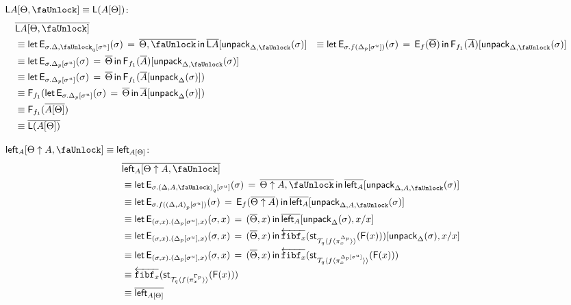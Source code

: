 \documentclass[10pt]{article}
\theoremstyle{definition}
\newcommand{\rewrite}[2]{\overleftarrow{#1}(#2)}
\newcommand\F[2]{\ensuremath{\mathsf{F}_{#1}(#2)}}
\newcommand\StI[2]{\ensuremath{\mathsf{st}_{#1}(#2)}}
\newcommand\FI[1]{\ensuremath{\mathsf{F}{(#1)}}}
\newcommand\EEs[4]{\ensuremath{\mathsf{let} \, \mathsf{E}_{#1}(#3) \, = \, {#2} \, \mathsf{in} \, #4}}
\newcommand\EIs[2]{\ensuremath{\mathsf{E}_{#1}{(#2)}}}
\newcommand\ApEl[2]{\mathcal{T}_{#1}\langle#2\rangle}
\newcommand\ap[2]{\ensuremath{#1 \langle #2 \rangle }}
\newcommand\unpack[2]{\ensuremath{\mathsf{unpack}_{#1}(#2)}}
\newcommand\unp[2]{\ensuremath{{#2}^u}}
\newcommand{\modeof}[1]{{#1}_p}
\newcommand{\modeofq}[1]{{#1}_q}
\newcommand{\upstairs}[1]{\overline{#1}}
\newcommand\fibf[1]{\ensuremath{\mathtt{fibf}_{#1}}}
\newcommand{\lock}{\text{\faUnlock}}
\newcommand{\Ltype}[1]{\mathsf{L}{#1}}
\newcommand{\LI}[1]{\mathsf{left}_{#1}}
\begin{document}
\begin{enumerate}[style = multiline, labelwidth = 80pt]
\item[{$\Ltype{A}[\Theta, \lock] \equiv \Ltype{(A[\Theta])}$}:]
\begin{align*}
&\upstairs{\Ltype{A}[\Theta, \lock]} \\
&\equiv \EEs{\sigma.\modeofq{\Delta, \lock}[\unp{\Delta, \lock}{\sigma}]}{\upstairs{\Theta, \lock}}{\sigma}{\upstairs{\Ltype{A}}[\unpack{\Delta, \lock}{\sigma}]}
&\equiv \EEs{\sigma.f(\modeof{\Delta}[\unp{\Delta}{\sigma}])}{\EIs{f}{\upstairs{\Theta}}}{\sigma}{ \F{f_1}{\upstairs{A}}[\unpack{\Delta, \lock}{\sigma}]}\\
&\equiv \EEs{\sigma.\modeof{\Delta}[\unp{\Delta}{\sigma}]}{\upstairs{\Theta}}{\sigma}{ \F{f_1}{\upstairs{A}}[\unpack{\Delta, \lock}{\sigma}]}\\
&\equiv \EEs{\sigma.\modeof{\Delta}[\unp{\Delta}{\sigma}]}{\upstairs{\Theta}}{\sigma}{
\F{f_1}{\upstairs{A}[\unpack{\Delta}{\sigma}]}}\\
&\equiv \F{f_1}{\EEs{\sigma.\modeof{\Delta}[\unp{\Delta}{\sigma}]}{\upstairs{\Theta}}{\sigma}{\upstairs{A}[\unpack{\Delta}{\sigma}]}}\\
&\equiv \F{f_1}{\upstairs{A[\Theta]}} \\
&\equiv \upstairs{\Ltype{(A[\Theta])}}
\end{align*}

\item[{$\LI{A}[\Theta \uparrow A, \lock] \equiv \LI{A[\Theta]}$}:]
\begin{align*}
&\upstairs{\LI{A}[\Theta \uparrow A, \lock]} \\
&\equiv \EEs{\sigma.\modeofq{(\Delta, A, \lock)}[\unp{\Delta, A, \lock}{\sigma}]}{\upstairs{\Theta \uparrow A, \lock}}{\sigma}{\upstairs{\LI{A}}[\unpack{\Delta, A, \lock}{\sigma}]} \\
&\equiv \EEs{\sigma.f(\modeof{(\Delta, A)}[\unp{\Delta, A}{\sigma}])}{\EIs{f}{\upstairs{\Theta \uparrow A}}}{\sigma}{\upstairs{\LI{A}}[\unpack{\Delta, A, \lock}{\sigma}]} \\
&\equiv \EEs{(\sigma, x). (\modeof{\Delta}[\unp{\Delta}{\sigma}], x)}{(\upstairs{\Theta}, x)}{\sigma, x}{\upstairs{\LI{A}}[\unpack{\Delta}{\sigma}, x/x]} \\
&\equiv \EEs{(\sigma, x). (\modeof{\Delta}[\unp{\Delta}{\sigma}], x)}{(\upstairs{\Theta}, x)}{\sigma, x}{\rewrite{\fibf{x}}{\StI{\ApEl{q}{\ap{f}{\pi^{\modeof{\Delta}}_x}}}{\FI{x}}}[\unpack{\Delta}{\sigma}, x/x]} \\
&\equiv \EEs{(\sigma, x). (\modeof{\Delta}[\unp{\Delta}{\sigma}], x)}{(\upstairs{\Theta}, x)}{\sigma, x}{\rewrite{\fibf{x}}{\StI{\ApEl{q}{\ap{f}{\pi^{\modeof{\Delta}[\unp{\Delta}{\sigma}]}_x}}}{\FI{x}}}} \\
&\equiv \rewrite{\fibf{x}}{\StI{\ApEl{q}{\ap{f}{\pi^{\modeof{\Gamma}}_x}}}{\FI{x}}} \\
&\equiv \upstairs{\LI{A[\Theta]}}
\end{align*}


\end{enumerate}
\end{document}
